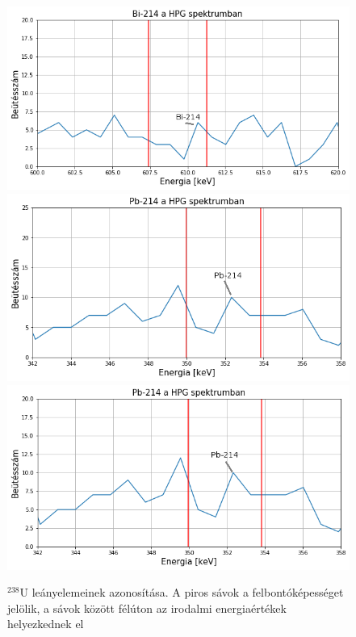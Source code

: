 \documentclass[12pt,a4paper]{article}
\begin{document}
\begin{figure}[!h]
\centering
\includegraphics[scale=1]{Bi_csucs}
\includegraphics[scale=1]{Pb_csucs}
\includegraphics[scale=1]{Pb_2csucs}

\caption{$^{238}$U leányelemeinek azonosítása. A piros sávok a felbontóképességet jelölik, a sávok között félúton az irodalmi energiaértékek helyezkednek el}\label{fig:11}
\end{figure}
\newpage
\end{document}
